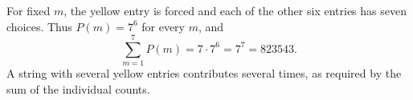 For fixed $m$, the yellow entry is forced and each of the other six entries has seven choices. Thus $P(m)=7^6$ for every $m$, and
\[
\boxed{\sum_{m=1}^7P(m)=7\cdot7^6=7^7=823543}.
\]
A string with several yellow entries contributes several times, as required by the sum of the individual counts.
